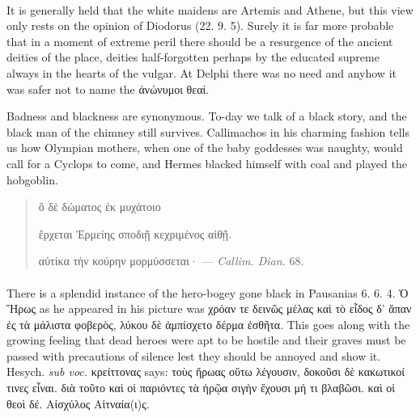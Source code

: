 \documentclass[a4paper, 11pt, oneside, polutonikogreek, english]{article}
\begin{document}
\paragraph{}
It is generally held that the white maidens are Artemis and Athene, but this view only rests on the opinion of Diodorus (22. 9. 5). Surely it is far more probable that in a moment of extreme peril there should be a resurgence of the ancient deities of the place, deities half-forgotten perhaps by the educated supreme always in the hearts of the vulgar. At Delphi there was no need and anyhow it was safer not to name the ἀνώνυμοι θεαί.

Badness and blackness are synonymous. To-day we talk of a black story, and the black man of the chimney still survives. Callimachos in his charming fashion tells us how Olympian mothers, when one of the baby goddesses was naughty, would call for a Cyclops to come, and Hermes blacked himself with coal and played the hobgoblin.
\begin{quotation}
\hspace*{10mm}ὃ δὲ δώματος ἐκ μυχάτοιο

ἔρχεται Ἑρμείης σποδιῇ κεχριμένος αἰθῇ.

αὐτίκα τὴν κούρην μορμύσσεται· --- \emph{Callim. Dian.} 68.
\end{quotation}
\paragraph{}
There is a splendid instance of the hero-bogey gone black in Pausanias 6. 6. 4. Ὁ Ἥρως as he appeared in his picture was χρόαν τε δεινῶς μέλας καὶ τὸ εἶδος δ' ἅπαν ἐς τὰ μάλιστα φοβερὸς, λύκου δὲ ἀμπίσχετο δέρμα ἐσθῆτα. This goes along with the growing feeling that dead heroes were apt to be hostile and their graves must be passed with precautions of silence lest they should be annoyed and show it. Hesych. \emph{sub voc.} κρείττονας says: τοὺς ἥρωας οὕτω λέγουσιν, δοκοῦσι δὲ κακωτικοί τινες εἶναι. διὰ τοῦτο καὶ οἱ παριόντες τὰ ἡρῷα σιγὴν ἔχουσι μή τι βλαβῶσι. καὶ οἱ θεοὶ δέ. Αἰσχύλος Αἰτναία(ι)ς.
\end{document}
